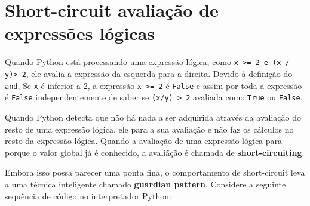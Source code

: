 
\section{Short-circuit avaliação de expressões lógicas}


Quando Python está processando uma expressão lógica, como
{\tt x >= 2 e (x / y)> 2}, ele avalia a expressão
da esquerda para a direita. Devido à definição do {\tt and},
Se {\tt x} é inferior a 2, a expressão {\tt x >= 2} é
{\tt False} e assim por toda a expressão é {\tt False} independentemente
de saber se {\tt (x/y) > 2} avaliada como {\tt True} ou {\tt False}.


Quando Python detecta que não há nada a ser adquirida através da avaliação do 
resto de uma expressão lógica, ele para a sua avaliação e não 
faz os cálculos no resto da expressão lógica.
Quando a avaliação de uma expressão lógica para porque o valor global já 
é conhecido, a avaliãção é chamada de {\bf short-circuiting}.



Embora isso possa parecer uma ponta fina, o comportamento de short-circuit
leva a uma técnica inteligente chamado {\bf guardian pattern}.
Considere a seguinte sequência de código no interpretador Python:

